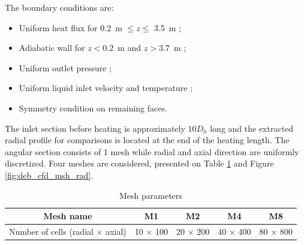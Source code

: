 The boundary conditions are:

\begin{itemize}
\item Uniform heat flux for $0.2$\ m $\leq z \leq$ 3.5\ m ;
\item Adiabatic wall for $z<0.2$\ m and $z>3.7$\ m ;
\item Uniform outlet pressure ;
\item Uniform liquid inlet velocity and temperature ;
\item Symmetry condition on remaining faces.
\end{itemize}

The inlet section before heating is approximately $10D_{h}$ long and the extracted radial profile for comparisons is located at the end of the heating length. The angular section consists of 1 mesh while radial and axial direction are uniformly discretized. Four meshes are considered, presented on Table \ref{tab:deb_cfd_msh} and Figure \ref{fig:deb_cfd_msh_rad}.



\begin{table}[!h]
\centering

\begin{tabular}{c||c|c|c|c}
Mesh name & M1 & M2 & M4 & M8  \\
\hline
Number of cells (radial $\times$ axial) & 10  $\times$ 100 & 20 $\times$ 200 & 40 $\times$ 400 & 80 $\times$ 800
\end{tabular}

\caption{Mesh parameters}
\label{tab:deb_cfd_msh}

\end{table}

\npar

